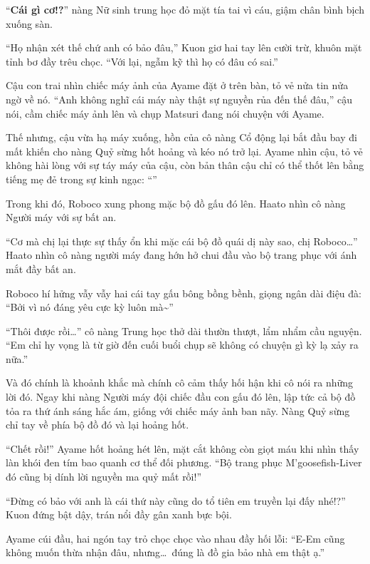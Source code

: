 \documentclass[../main.tex]{subfiles}
\begin{document}
``\textbf{Cái gì cơ!?}'' nàng Nữ sinh trung học đỏ mặt tía tai vì cáu, giậm chân bình bịch xuống sàn.

``Họ nhận xét thế chứ anh có bảo đâu,'' Kuon giơ hai tay lên cười trừ, khuôn mặt tỉnh bơ đầy trêu chọc. ``Với lại, ngẫm kỹ thì họ có đâu có sai.''

Cậu con trai nhìn chiếc máy ảnh của Ayame đặt ở trên bàn, tỏ vẻ nửa tin nửa ngờ về nó. ``Anh không nghĩ cái máy này thật sự nguyền rủa đến thế đâu,'' cậu nói, cầm chiếc máy ảnh lên và chụp Matsuri đang nói chuyện với Ayame.

Thế nhưng, cậu vừa hạ máy xuống, hồn của cô nàng Cổ động lại bắt đầu bay đi mất khiến cho nàng Quỷ sừng hốt hoảng và kéo nó trở lại. Ayame nhìn cậu, tỏ vẻ không hài lòng với sự táy máy của cậu, còn bản thân cậu chỉ có thể thốt lên bằng tiếng mẹ đẻ trong sự kinh ngạc: ``''

Trong khi đó, Roboco xung phong mặc bộ đồ gấu đó lên. Haato nhìn cô nàng Người máy với sự bất an.

``Cơ mà chị lại thực sự thấy ổn khi mặc cái bộ đồ quái dị này sao, chị Roboco\dots'' Haato nhìn cô nàng người máy đang hớn hở chui đầu vào bộ trang phục với ánh mắt đầy bất an.

Roboco hí hửng vẫy vẫy hai cái tay gấu bông bồng bềnh, giọng ngân dài điệu đà: ``Bởi vì nó đáng yêu cực kỳ luôn mà\~{}''

``Thôi được rồi\dots'' cô nàng Trung học thở dài thườn thượt, lẩm nhẩm cầu nguyện. ``Em chỉ hy vọng là từ giờ đến cuối buổi chụp sẽ không có chuyện gì kỳ lạ xảy ra nữa.''

Và đó chính là khoảnh khắc mà chính cô cảm thấy hối hận khi cô nói ra những lời đó. Ngay khi nàng Người máy đội chiếc đầu con gấu đó lên, lập tức cả bộ đồ tỏa ra thứ ánh sáng hắc ám, giống với chiếc máy ảnh ban nãy. Nàng Quỷ sừng chỉ tay về phía bộ đồ đó và lại hoảng hốt.


``Chết rồi!'' Ayame hốt hoảng hét lên, mặt cắt không còn giọt máu khi nhìn thấy làn khói đen tím bao quanh cơ thể đối phương. ``Bộ trang phục M'goosefish-Liver đó cũng bị dính lời nguyền ma quỷ mất rồi!''

``Đừng có bảo với anh là cái thứ này cũng do tổ tiên em truyền lại đấy nhé!?'' Kuon đứng bật dậy, trán nổi đầy gân xanh bực bội.

Ayame cúi đầu, hai ngón tay trỏ chọc chọc vào nhau đầy hối lỗi: ``E-Em cũng không muốn thừa nhận đâu, nhưng\dots\ đúng là đồ gia bảo nhà em thật ạ.''
\end{document}
